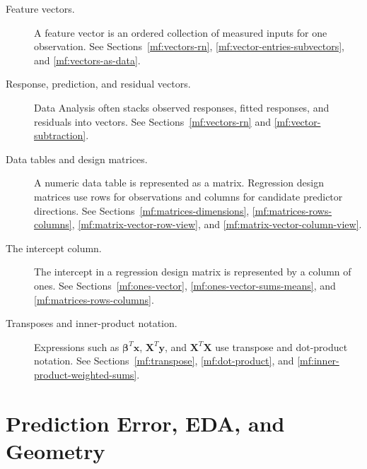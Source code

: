 \begin{description}
    \item[Feature vectors.] A feature vector is an ordered collection of measured inputs for one observation. See Sections~\ref{mf:vectors-rn}, \ref{mf:vector-entries-subvectors}, and \ref{mf:vectors-as-data}.

    \item[Response, prediction, and residual vectors.] Data Analysis often stacks observed responses, fitted responses, and residuals into vectors. See Sections~\ref{mf:vectors-rn} and \ref{mf:vector-subtraction}.

    \item[Data tables and design matrices.] A numeric data table is represented as a matrix. Regression design matrices use rows for observations and columns for candidate predictor directions. See Sections~\ref{mf:matrices-dimensions}, \ref{mf:matrices-rows-columns}, \ref{mf:matrix-vector-row-view}, and \ref{mf:matrix-vector-column-view}.

    \item[The intercept column.] The intercept in a regression design matrix is represented by a column of ones. See Sections~\ref{mf:ones-vector}, \ref{mf:ones-vector-sums-means}, and \ref{mf:matrices-rows-columns}.

    \item[Transposes and inner-product notation.] Expressions such as \(\boldsymbol\beta^T\mathbf{x}\), \(\mathbf{X}^T\mathbf{y}\), and \(\mathbf{X}^T\mathbf{X}\) use transpose and dot-product notation. See Sections~\ref{mf:transpose}, \ref{mf:dot-product}, and \ref{mf:inner-product-weighted-sums}.
\end{description}

\section{Prediction Error, EDA, and Geometry}
\label{mf:da-bridge-prediction-eda-geometry}


